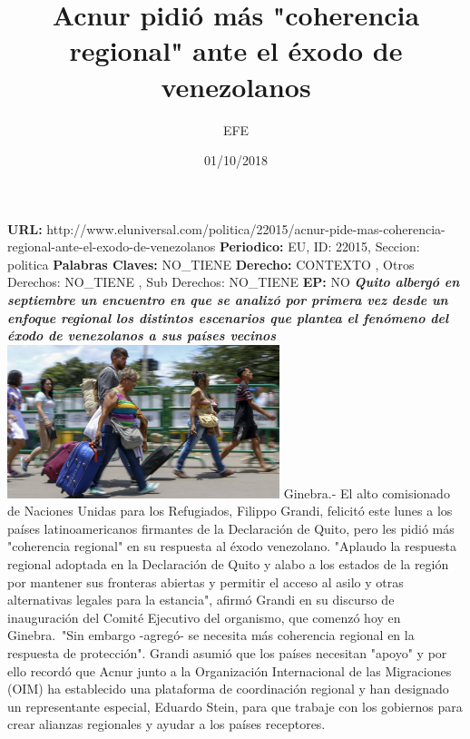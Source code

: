 \documentclass{article}%
\title{\textbf{Acnur pidió más "coherencia regional" ante el éxodo de venezolanos}}%
\author{EFE}%
\date{01/10/2018}%
\begin{document}
%
\normalsize%
\maketitle%
\textbf{URL: }%
http://www.eluniversal.com/politica/22015/acnur{-}pide{-}mas{-}coherencia{-}regional{-}ante{-}el{-}exodo{-}de{-}venezolanos\newline%
%
\textbf{Periodico: }%
EU, %
ID: %
22015, %
Seccion: %
politica\newline%
%
\textbf{Palabras Claves: }%
NO\_TIENE\newline%
%
\textbf{Derecho: }%
CONTEXTO%
, Otros Derechos: %
NO\_TIENE%
, Sub Derechos: %
NO\_TIENE%
\newline%
%
\textbf{EP: }%
NO\newline%
\newline%
%
\textbf{\textit{Quito albergó en septiembre un encuentro en que se analizó por primera vez desde un enfoque regional los distintos escenarios que plantea el fenómeno del éxodo de venezolanos a sus países vecinos}}%
\newline%
\newline%
%
\includegraphics[width=300px]{183.jpg}%
\newline%
%
Ginebra.{-} El alto comisionado de Naciones Unidas para los Refugiados, Filippo Grandi, felicitó este lunes a los países latinoamericanos firmantes de la Declaración de Quito, pero les pidió más "coherencia regional" en su respuesta al éxodo venezolano.%
\newline%
%
"Aplaudo la respuesta regional adoptada en la Declaración de Quito y alabo a los estados de la región por mantener sus fronteras abiertas y permitir el acceso al asilo y otras alternativas legales para la estancia", afirmó Grandi en su discurso de inauguración del Comité Ejecutivo del organismo, que comenzó hoy en Ginebra.~"Sin embargo {-}agregó{-} se necesita más coherencia regional en la respuesta de protección".%
\newline%
%
Grandi asumió que los países necesitan "apoyo" y por ello recordó que Acnur junto a la Organización Internacional de las Migraciones (OIM) ha establecido una plataforma de coordinación regional y han designado un representante especial, Eduardo Stein, para que trabaje con los gobiernos para crear alianzas regionales y ayudar a los países receptores.%
\end{document}
